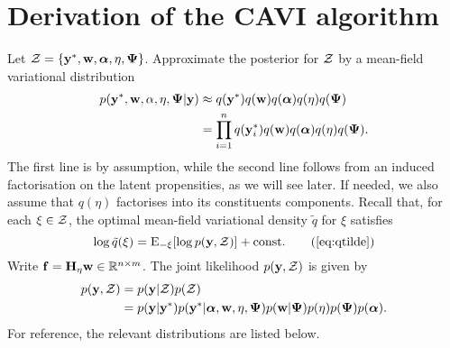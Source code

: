 \section{Derivation of the CAVI algorithm}

Let ${\mathcal Z} = \{{\mathbf y}^*,{\mathbf w},{\bm\alpha},\eta,{\bm\Psi} \}$.
Approximate the posterior for ${\mathcal Z}$ by a mean-field variational distribution
\begin{align*}
  p({\mathbf y}^*, {\mathbf w}, \alpha, \eta, {\bm\Psi} | {\mathbf y}) 
  &\approx q({\mathbf y}^*)q({\mathbf w})q({\bm\alpha})q(\eta)q({\bm\Psi}) \\
  &= \prod_{i=1}^n q({\mathbf y}_{i}^*)q({\mathbf w})q({\bm\alpha})q(\eta)q({\bm\Psi}).
\end{align*}
The first line is by assumption, while the second line follows from an induced factorisation on the latent propensities, as we will see later. 
If needed, we also assume that $q(\eta)$ factorises into its constituents components.
Recall that, for each $\xi\in{\mathcal Z}$, the optimal mean-field variational density $\tilde q$ for $\xi$ satisfies
\[
  \log \tilde q(\xi) = \E_{-\xi} [\log p(\by, \cZ)] + \const \tag{\ref{eq:qtilde}}
\]
Write ${\mathbf f} = {\mathbf H}_\eta {\mathbf w} \in  \mathbb{R}^{n\times m}$.
The joint likelihood $p({\mathbf y}, {\mathcal Z})$ is given by
\begin{align*}
  p({\mathbf y}, {\mathcal Z}) 
  &= p({\mathbf y}|{\mathcal Z})p({\mathcal Z}) \\
  &= p({\mathbf y}|{\mathbf y}^*) p({\mathbf y}^* | {\bm\alpha},{\mathbf w},\eta,{\bm\Psi}) p({\mathbf w}|{\bm\Psi}) p(\eta) p({\bm\Psi})p({\bm\alpha}).
\end{align*}
For reference, the relevant distributions are listed below.

